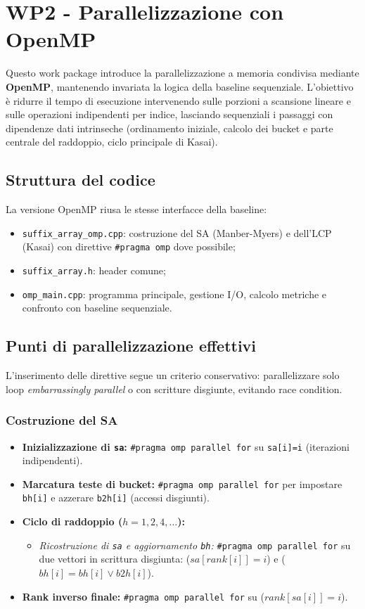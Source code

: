 \chapter{WP2 - Parallelizzazione con OpenMP}
	
	Questo work package introduce la parallelizzazione a memoria condivisa mediante \textbf{OpenMP}, mantenendo invariata la logica della baseline sequenziale.
	L'obiettivo è ridurre il tempo di esecuzione intervenendo sulle porzioni a scansione lineare e sulle operazioni indipendenti per indice, lasciando sequenziali i passaggi con dipendenze dati intrinseche (ordinamento iniziale, calcolo dei bucket e parte centrale del raddoppio, ciclo principale di Kasai).
	
	\section{Struttura del codice}
		La versione OpenMP riusa le stesse interfacce della baseline:
		\begin{itemize}
			\item \texttt{suffix\_array\_omp.cpp}: costruzione del SA (Manber-Myers) e dell'LCP (Kasai) con direttive \texttt{\#pragma omp} dove possibile;
			\item \texttt{suffix\_array.h}: header comune;
			\item \texttt{omp\_main.cpp}: programma principale, gestione I/O, calcolo metriche e confronto con baseline sequenziale.
		\end{itemize}
	
	\section{Punti di parallelizzazione effettivi}
		L'inserimento delle direttive segue un criterio conservativo: parallelizzare solo loop \emph{embarrassingly parallel} o con scritture disgiunte, evitando race condition.
		
		\subsection*{Costruzione del SA}
			\begin{itemize}
				\item \textbf{Inizializzazione di \texttt{sa}:} \texttt{\#pragma omp parallel for} su \texttt{sa[i]=i} (iterazioni indipendenti).
				\item \textbf{Marcatura teste di bucket:} \texttt{\#pragma omp parallel for} per impostare \texttt{bh[i]} e azzerare \texttt{b2h[i]} (accessi disgiunti).
				\item \textbf{Ciclo di raddoppio ($h=1,2,4,\dots$):}
				\begin{itemize}
					\item \emph{Ricostruzione di \texttt{sa} e aggiornamento \texttt{bh}:} \texttt{\#pragma omp parallel for} su due vettori in scrittura disgiunta: ($sa[rank[i]] = i$) e (\texttt{$bh[i] = bh[i] \lor b2h[i]$}).
				\end{itemize}
				\item \textbf{Rank inverso finale:} \texttt{\#pragma omp parallel for} su ($rank[sa[i]] = i$).
			\end{itemize}
		
